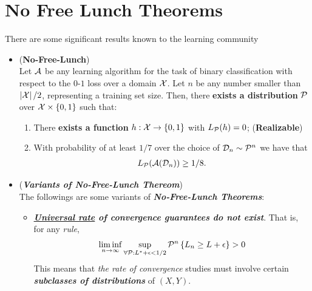 \documentclass[11pt]{article}
\begin{document}
\section{No Free Lunch Theorems}
There are some significant results known to the learning community
\begin{itemize}
\item  \begin{theorem} (\textbf{No-Free-Lunch}) \citep{shalev2014understanding}\\
Let ${\mathcal A}$ be any learning algorithm for the task of binary classification with respect to the $0$-$1$ loss over a domain ${\mathcal X}$. Let $n$ be any number smaller than $\left\lvert {\mathcal X} \right\rvert/2$, representing a training set size. Then, there \textbf{exists a distribution} ${\mathcal P}$ over ${\mathcal X} \times \left\{0,1\right\}$ such that:
\begin{enumerate}
\item There \textbf{exists a function} $h: {\mathcal X} \to \left\{0,1\right\}$ with $L_{{\mathcal P}}(h) = 0$; (\textbf{Realizable})
\item With probability of at least $1/7$ over the choice of  ${\mathcal D}_n \sim {\mathcal P}^n$ we have that
\begin{align*}
L_{{\mathcal P}}({\mathcal A}({\mathcal D}_n)) \ge 1/8.
\end{align*}
\end{enumerate}
\end{theorem}

\item \begin{remark} (\textbf{\emph{Variants of No-Free-Lunch Thereom}})\\
The followings are some variants of \emph{\textbf{No-Free-Lunch Theorems}}:
\begin{itemize}
\item \emph{\textbf{\underline{Universal rate} of convergence guarantees do not exist}}. 
That is, for any \emph{rule},
\begin{align*}
\liminf\limits_{n \rightarrow \infty} \sup_{\forall {\mathcal P}: L^{*} + \epsilon < 1/2}{\mathcal P}^{n}\left\{L_n \ge L + \epsilon\right\} > 0
\end{align*} 
This means that \emph{the rate of convergence} studies must involve certain \emph{\textbf{subclasses of distributions}} of $(X, Y)$. 


\end{itemize}
\end{remark}
\end{itemize}
\end{document}
